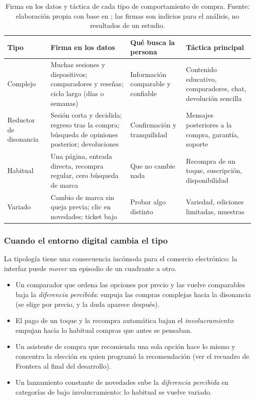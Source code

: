 \begin{table}[!htb]
\centering
\footnotesize
\begin{tabular}{@{}>{\raggedright}p{2.0cm}>{\raggedright}p{3.0cm}>{\raggedright}p{3.4cm}>{\raggedright\arraybackslash}p{3.6cm}@{}}
\toprule
Tipo & Firma en los datos & Qué busca la persona & Táctica principal \\
\midrule
Complejo & Muchas sesiones y dispositivos; comparadores y reseñas; ciclo largo (días o semanas) & Información comparable y confiable & Contenido educativo, comparadores, chat, devolución sencilla \\
Reductor de disonancia & Sesión corta y decidida; regreso tras la compra; búsqueda de opiniones posterior; devoluciones & Confirmación y tranquilidad & Mensajes posteriores a la compra, garantía, soporte \\
Habitual & Una página, entrada directa, recompra regular, cero búsqueda de marca & Que no cambie nada & Recompra de un toque, suscripción, disponibilidad \\
Variado & Cambio de marca sin queja previa; clic en novedades; ticket bajo & Probar algo distinto & Variedad, ediciones limitadas, muestras \\
\bottomrule
\end{tabular}
\caption{Firma en los datos y táctica de cada tipo de comportamiento de
compra. Fuente: elaboración propia con base en \textcite{assael1987}; las
firmas son indicios para el análisis, no resultados de un estudio.}
\label{tab:cap09-tipos}
\end{table}

\subsubsection{Cuando el entorno digital cambia el tipo}

La tipología tiene una consecuencia incómoda para el comercio electrónico: la
interfaz puede \emph{mover} un episodio de un cuadrante a otro.

\begin{itemize}
  \item Un comparador que ordena las opciones por precio y las vuelve
  comparables baja la \emph{diferencia percibida}: empuja las compras
  complejas hacia la disonancia (se elige por precio, y la duda aparece después).
  \item El pago de un toque y la recompra automática bajan el
  \emph{involucramiento}: empujan hacia lo habitual compras que antes se pensaban.
  \item Un asistente de compra que recomienda una sola opción hace lo mismo y
  concentra la elección en quien programó la recomendación (ver el recuadro
  de Frontera al final del desarrollo).
  \item Un lanzamiento constante de novedades sube la \emph{diferencia percibida}
  en categorías de bajo involucramiento: lo habitual se vuelve variado.
\end{itemize}

